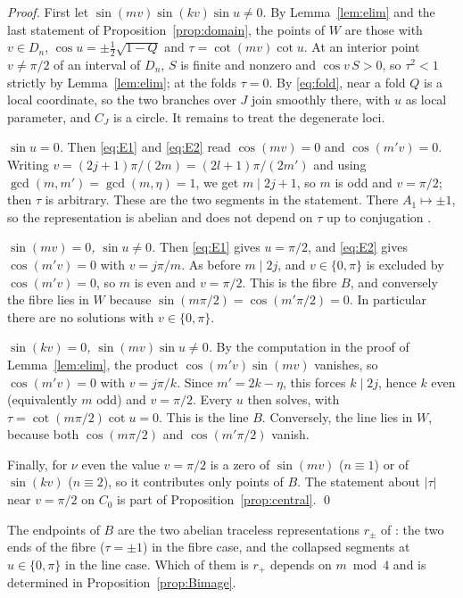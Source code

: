 \begin{proof}
First let $\sin(mv)\sin(kv)\sin u\neq0$. By Lemma~\ref{lem:elim} and the last statement of
Proposition~\ref{prop:domain}, the points of $W$ are those with $v\in D_n$, $\cos u=\pm\frac12\sqrt{1-Q}$ and $\tau=\cot(mv)\cot u$. At an interior point $v\neq\pi/2$ of an interval
of $D_n$, $S$ is finite and nonzero and $\cos v\,S>0$, so $\tau^2<1$ strictly by Lemma~\ref{lem:elim}; at the folds
$\tau=0$. By \eqref{eq:fold}, near a fold $Q$ is a local coordinate, so the two branches over $J$ join smoothly
there, with $u$ as local parameter, and $C_J$ is a circle. It remains to treat the degenerate loci.

\emph{$\sin u=0$.} Then \eqref{eq:E1} and \eqref{eq:E2} read $\cos(mv)=0$ and $\cos(m'v)=0$. Writing
$v=(2j+1)\pi/(2m)=(2l+1)\pi/(2m')$ and using $\gcd(m,m')=\gcd(m,\eta)=1$, we get $m\mid2j+1$, so $m$ is odd and
$v=\pi/2$; then $\tau$ is arbitrary. These are the two segments in the statement. There $A_1\mapsto\pm1$, so
the representation is abelian and does not depend on $\tau$ up to conjugation \cite[Thm.~10.2]{HHK2}.

\emph{$\sin(mv)=0$, $\sin u\neq0$.} Then \eqref{eq:E1} gives $u=\pi/2$, and \eqref{eq:E2} gives
$\cos(m'v)=0$ with $v=j\pi/m$. As before $m\mid2j$, and $v\in\{0,\pi\}$ is excluded by $\cos(m'v)=0$, so $m$ is even
and $v=\pi/2$. This is the fibre $B$, and conversely the fibre lies in $W$ because
$\sin(m\pi/2)=\cos(m'\pi/2)=0$. In particular there are no solutions with $v\in\{0,\pi\}$.

\emph{$\sin(kv)=0$, $\sin(mv)\sin u\neq0$.} By the computation in the proof of Lemma~\ref{lem:elim}, the
product $\cos(m'v)\sin(mv)$ vanishes, so $\cos(m'v)=0$ with $v=j\pi/k$. Since $m'=2k-\eta$, this forces $k\mid2j$, hence $k$
even (equivalently $m$ odd) and $v=\pi/2$. Every $u$ then solves, with $\tau=\cot(m\pi/2)\cot u=0$. This is the
line $B$. Conversely, the line lies in $W$, because both $\cos(m\pi/2)$ and $\cos(m'\pi/2)$ vanish.

Finally, for $\nu$ even the value $v=\pi/2$ is a zero of $\sin(mv)$ ($n\equiv1$) or of $\sin(kv)$
($n\equiv2$), so it contributes only points of $B$. The statement about $|\tau|$ near $v=\pi/2$ on $C_0$ is
part of Proposition~\ref{prop:central}. \qed
\end{proof}

The endpoints of $B$ are the two abelian traceless representations $r_\pm$ of \cite[\S8.1]{HHK2}: the two ends
of the fibre ($\tau=\pm1$) in the fibre case, and the collapsed segments at $u\in\{0,\pi\}$ in the line case. Which
of them is $r_+$ depends on $m\bmod4$ and is determined in Proposition~\ref{prop:Bimage}.

